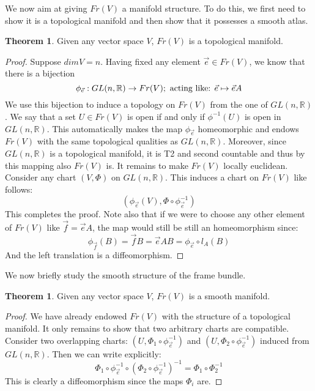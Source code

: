 \documentclass[12pt,a4paper]{report}
\theoremstyle{definition}
\theoremstyle{Theorem}
\newtheorem{Theo}[Def]{Theorem}
\theoremstyle{definition}
\theoremstyle{definition}
\begin{document}
	We now aim at giving $Fr(V)$ a manifold structure. To do this, we first need to show it is a topological manifold and then show that it possesses a smooth atlas.
	\begin{Theo}
		Given any vector space $V$, $Fr(V)$ is a topological manifold.
	\end{Theo}
	\begin{proof}
		Suppose $dim V=n$. Having fixed any element $\vec{e}\in Fr(V)$, we know that there is a bijection 
		$$\phi_{\vec{e}}:GL(n,\mathbb{R})\rightarrow Fr(V); \hbox{ acting like: }\vec{e}\mapsto\vec{e}A$$
		We use this bijection to induce a topology on $Fr(V)$ from the one of $GL(n,\mathbb{R})$. We say that a set $U\in Fr(V)$ is open if and only if $\phi^{-1}(U)$ is open in $GL(n,\mathbb{R})$. This automatically makes the map $\phi_{\vec{e}}$ homeomorphic and endows $Fr(V)$ with the same topological qualities as $GL(n,\mathbb{R})$. Moreover, since $GL(n,\mathbb{R})$ is a topological manifold, it is T2 and second countable and thus by this mapping also $Fr(V)$ is.
		It remains to make $Fr(V)$ locally euclidean. Consider any chart $(V,\Phi)$ on $GL(n,\mathbb{R})$. This induces a chart on $Fr(V)$ like follows:
		$$(\phi_{\vec{e}}(V),\Phi\circ\phi^{-1}_{\vec{e}})$$
		This completes the proof.
		Note also that if we were to choose any other element of $Fr(V)$ like $\vec{f}=\vec{e}A$, the map would still be still an homeomorphism since:
		$$\phi_{\vec{f}}(B)=\vec{f}B=\vec{e}AB=\phi_{\vec{e}}\circ l_A(B)$$
		And the left translation is a diffeomorphism.
	\end{proof}
	We now briefly study the smooth structure of the frame bundle. 
	\begin{Theo}
		Given any vector space $V$, $Fr(V)$ is a smooth manifold.
	\end{Theo}
	\begin{proof}
		We have already endowed $Fr(V)$ with the structure of a topological manifold. It only remains to show that two arbitrary charts are compatible. Consider two overlapping charts: $(U,\Phi_1\circ\phi^{-1}_{\vec{e}})$ and $(U,\Phi_2\circ\phi^{-1}_{\vec{e}})$ induced from $GL(n,\mathbb{R})$. Then we can write explicitly:
		$$\Phi_1\circ\phi^{-1}_{\vec{e}}\circ (\Phi_2\circ\phi^{-1}_{\vec{e}})^{-1}=
		\Phi_1\circ \Phi_2^{-1}$$ 
		This is clearly a diffeomorphism since the maps $\Phi_i$ are.
	\end{proof}
\end{document}
